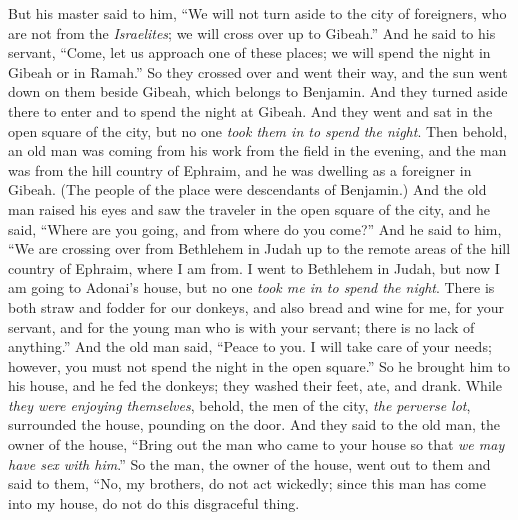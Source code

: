 \begin{biblechapter}
\verse But his master said to him, “We will not turn aside to the city of foreigners, who are not from the \textit{Israelites}; we will cross over up to Gibeah.”
\verse And he said to his servant, “Come, let us approach one of these places; we will spend the night in Gibeah or in Ramah.”
\verse So they crossed over and went their way, and the sun went down on them beside Gibeah, which belongs to Benjamin.
\verse And they turned aside there to enter and to spend the night at Gibeah. And they went and sat in the open square of the city, but no one \textit{took them in to spend the night}.
\verse Then behold, an old man was coming from his work from the field in the evening, and the man was from the hill country of Ephraim, and he was dwelling as a foreigner in Gibeah. (The people of the place were descendants of Benjamin.)
\verse And the old man raised his eyes and saw the traveler in the open square of the city, and he said, “Where are you going, and from where do you come?”
\verse And he said to him, “We are crossing over from Bethlehem in Judah up to the remote areas of the hill country of Ephraim, where I am from. I went to Bethlehem in Judah, but now I am going to Adonai’s house, but no one \textit{took me in to spend the night}.
\verse There is both straw and fodder for our donkeys, and also bread and wine for me, for your servant, and for the young man who is with your servant; there is no lack of anything.”
\verse And the old man said, “Peace to you. I will take care of your needs; however, you must not spend the night in the open square.”
\verse So he brought him to his house, and he fed the donkeys; they washed their feet, ate, and drank.
\verse While \textit{they were enjoying themselves}, behold, the men of the city, \textit{the perverse lot}, surrounded the house, pounding on the door. And they said to the old man, the owner of the house, “Bring out the man who came to your house so that \textit{we may have sex with him}.”
\verse So the man, the owner of the house, went out to them and said to them, “No, my brothers, do not act wickedly; since this man has come into my house, do not do this disgraceful thing.

\end{biblechapter}
